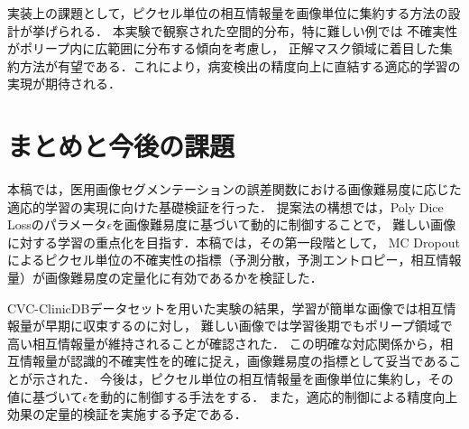 \documentclass[10pt, a4paper, twocolumn]{jarticle}
\begin{document}
実装上の課題として，ピクセル単位の相互情報量を画像単位に集約する方法の設計が挙げられる．
本実験で観察された空間的分布，特に難しい例では
不確実性がポリープ内に広範囲に分布する傾向を考慮し，
正解マスク領域に着目した集約方法が有望である．これにより，病変検出の精度向上に直結する適応的学習の実現が期待される．

\section{まとめと今後の課題}
本稿では，医用画像セグメンテーションの誤差関数における画像難易度に応じた適応的学習の実現に向けた基礎検証を行った．
提案法の構想では，Poly Dice Lossのパラメータ$\epsilon$を画像難易度に基づいて動的に制御することで，
難しい画像に対する学習の重点化を目指す．本稿では，その第一段階として，
MC Dropoutによるピクセル単位の不確実性の指標（予測分散，予測エントロピー，相互情報量）が画像難易度の定量化に有効であるかを検証した．

CVC-ClinicDBデータセットを用いた実験の結果，学習が簡単な画像では相互情報量が早期に収束するのに対し，
難しい画像では学習後期でもポリープ領域で高い相互情報量が維持されることが確認された．
この明確な対応関係から，相互情報量が認識的不確実性を的確に捉え，画像難易度の指標として妥当であることが示された．
今後は，ピクセル単位の相互情報量を画像単位に集約し，その値に基づいて$\epsilon$を動的に制御する手法をする．
また，適応的制御による精度向上効果の定量的検証を実施する予定である．
\end{document}
